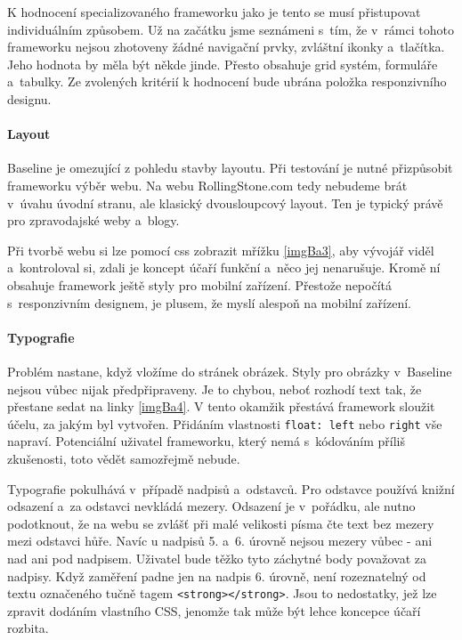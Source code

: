 \documentclass[thesis=B,czech]{FITthesis}[2012/06/26]
\begin{document}
K hodnocení specializovaného frameworku jako je tento se musí přistupovat individuálním způsobem. Už na začátku jsme seznámeni s~tím, že v~rámci tohoto frameworku nejsou zhotoveny žádné navigační prvky, zvláštní ikonky a~tlačítka. Jeho hodnota by měla být někde jinde. Přesto obsahuje grid  systém, formuláře a~tabulky. Ze zvolených kritérií k hodnocení bude ubrána položka responzivního designu.

\paragraph{Layout}

Baseline je omezující z pohledu stavby layoutu. Při testování je nutné přizpůsobit frameworku výběr webu. Na webu RollingStone.com tedy nebudeme brát v~úvahu úvodní stranu, ale klasický dvousloupcový layout. Ten je typický právě pro zpravodajské weby a~blogy.

Při tvorbě webu si lze pomocí css zobrazit mřížku \ref{imgBa3}, aby vývojář viděl a~kontroloval si, zdali je koncept účaří funkční a~něco jej nenarušuje. Kromě ní obsahuje framework ještě styly pro mobilní zařízení. Přestože nepočítá s~responzivním designem, je plusem, že myslí alespoň na mobilní zařízení. 



\paragraph{Typografie}

Problém nastane, když vložíme do stránek obrázek. Styly pro obrázky v~Baseline nejsou vůbec nijak předpřipraveny. Je to chybou, neboť rozhodí text tak, že přestane sedat na linky \ref{imgBa4}. V tento okamžik přestává framework sloužit účelu, za jakým byl vytvořen. Přidáním vlastnosti \verb#float: left# nebo \verb#right# vše napraví. Potenciální uživatel frameworku, který nemá s~kódováním příliš zkušenosti, toto vědět samozřejmě nebude.


Typografie pokulhává v~případě nadpisů a~odstavců. Pro odstavce používá knižní odsazení a~za odstavci nevkládá mezery. Odsazení je v~pořádku, ale nutno podotknout, že na webu se zvlášť při malé velikosti písma čte text bez mezery mezi odstavci hůře. Navíc u nadpisů 5. a~6. úrovně nejsou mezery vůbec - ani nad ani pod nadpisem. Uživatel bude těžko tyto záchytné body považovat za nadpisy. Když zaměření padne jen na nadpis 6. úrovně, není rozeznatelný od textu označeného tučně tagem \verb#<strong></strong>#. Jsou to nedostatky, jež lze zpravit dodáním vlastního CSS, jenomže tak může být lehce koncepce účaří rozbita.
\end{document}
